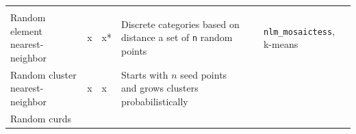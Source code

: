 \documentclass[11pt]{article}
\begin{document}
\begin{longtable}[]{@{}llllll@{}}
\begin{minipage}[t]{0.02\columnwidth}
\strut
\end{minipage} & \begin{minipage}[t]{0.02\columnwidth}\raggedright
\strut
\end{minipage}\tabularnewline
\begin{minipage}[t]{0.35\columnwidth}\raggedright
Random element nearest-neighbor\strut
\end{minipage} & \begin{minipage}[t]{0.07\columnwidth}\raggedright
x\strut
\end{minipage} & \begin{minipage}[t]{0.05\columnwidth}\raggedright
x*\strut
\end{minipage} & \begin{minipage}[t]{0.33\columnwidth}\raggedright
Discrete categories based on distance a set of \texttt{n} random
points\strut
\end{minipage} & \begin{minipage}[t]{0.02\columnwidth}\raggedright
\strut
\end{minipage} & \begin{minipage}[t]{0.02\columnwidth}\raggedright
\texttt{nlm\_mosaictess}, k-means\strut
\end{minipage}\tabularnewline
\begin{minipage}[t]{0.35\columnwidth}\raggedright
Random cluster nearest-neighbor\strut
\end{minipage} & \begin{minipage}[t]{0.07\columnwidth}\raggedright
x\strut
\end{minipage} & \begin{minipage}[t]{0.05\columnwidth}\raggedright
x\strut
\end{minipage} & \begin{minipage}[t]{0.33\columnwidth}\raggedright
Starts with \(n\) seed points and grows clusters probabilistically\strut
\end{minipage} & \begin{minipage}[t]{0.02\columnwidth}\raggedright
\strut
\end{minipage} & \begin{minipage}[t]{0.02\columnwidth}\raggedright
\strut
\end{minipage}\tabularnewline
\begin{minipage}[t]{0.35\columnwidth}\raggedright
Random curds\strut
\end{minipage} & \begin{minipage}[t]{0.07\columnwidth}\raggedright
\strut

\end{minipage}
\end{longtable}
\end{document}
